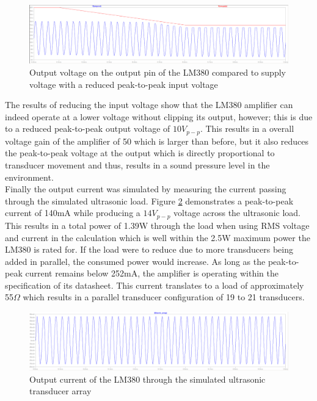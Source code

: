 \begin{figure}[ht!]
    \centering
    \includegraphics[width=\textwidth]{Figures/Design/amplifier/voutVsvsupplyInput100mv.png}
    \caption{Output voltage on the output pin of the LM380 compared to supply voltage with a reduced peak-to-peak input voltage}
    \label{fig:lm380outVsSupply100mvin}
\end{figure}

The results of reducing the input voltage show that the LM380 amplifier can indeed operate at a lower voltage without clipping its output, however; this is due to a reduced peak-to-peak output voltage of $10V_{p-p}$. This results in a overall voltage gain of the amplifier of 50 which is larger than before, but it also reduces the peak-to-peak voltage at the output which is directly proportional to transducer movement and thus, results in a sound pressure level in the environment.\\
Finally the output current was simulated by measuring the current passing through the simulated ultrasonic load. Figure \ref{fig:lm380Iout} demonstrates a peak-to-peak current of 140mA while producing a $14V_{p-p}$ voltage across the ultrasonic load. This results in a total power of 1.39W through the load when using RMS voltage and current in the calculation which is well within the 2.5W maximum power the LM380 is rated for. If the load were to reduce due to more transducers being added in parallel, the consumed power would increase. As long as the peak-to-peak current remains below 252mA, the amplifier is operating within the specification of its datasheet. This current translates to a load of approximately 55$\Omega$ which results in a parallel transducer configuration of 19 to 21 transducers.

\begin{figure}[ht!]
    \centering
    \includegraphics[width=\textwidth]{Figures/Design/amplifier/ioutusonic.png}
    \caption{Output current of the LM380 through the simulated ultrasonic transducer array}
    \label{fig:lm380Iout}
\end{figure}

